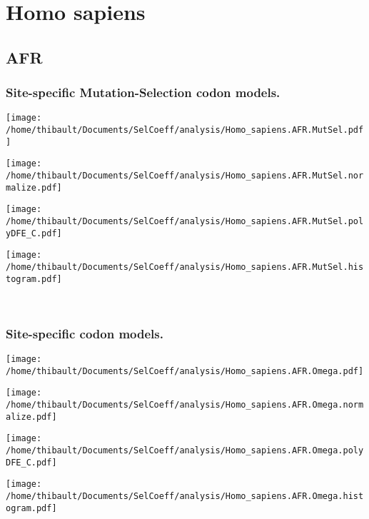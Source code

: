 \section{Homo sapiens} 
 
\subsection{AFR} 
 
\subsubsection*{Site-specific Mutation-Selection codon models.} 
\begin{minipage}{0.49\linewidth} 
\texttt{[image: /home/thibault/Documents/SelCoeff/analysis/Homo\_sapiens.AFR.MutSel.pdf]} 
\end{minipage}
\begin{minipage}{0.49\linewidth} 
\texttt{[image: /home/thibault/Documents/SelCoeff/analysis/Homo\_sapiens.AFR.MutSel.normalize.pdf]} 
\end{minipage}
\begin{minipage}{0.49\linewidth} 
\texttt{[image: /home/thibault/Documents/SelCoeff/analysis/Homo\_sapiens.AFR.MutSel.polyDFE\_C.pdf]} 
\end{minipage}
\begin{minipage}{0.49\linewidth} 
\texttt{[image: /home/thibault/Documents/SelCoeff/analysis/Homo\_sapiens.AFR.MutSel.histogram.pdf]} 
\end{minipage}
\\ 
\subsubsection*{Site-specific codon models.} 
\begin{minipage}{0.49\linewidth} 
\texttt{[image: /home/thibault/Documents/SelCoeff/analysis/Homo\_sapiens.AFR.Omega.pdf]} 
\end{minipage}
\begin{minipage}{0.49\linewidth} 
\texttt{[image: /home/thibault/Documents/SelCoeff/analysis/Homo\_sapiens.AFR.Omega.normalize.pdf]} 
\end{minipage}
\begin{minipage}{0.49\linewidth} 
\texttt{[image: /home/thibault/Documents/SelCoeff/analysis/Homo\_sapiens.AFR.Omega.polyDFE\_C.pdf]} 
\end{minipage}
\begin{minipage}{0.49\linewidth} 
\texttt{[image: /home/thibault/Documents/SelCoeff/analysis/Homo\_sapiens.AFR.Omega.histogram.pdf]} 
\end{minipage}
\\ 
